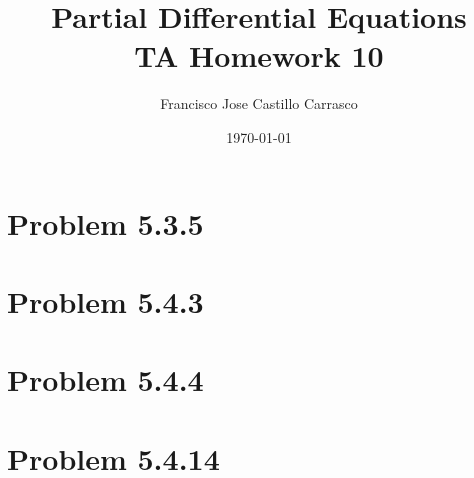 




\title{Partial Differential Equations\\TA Homework 10}
\author{Francisco Jose Castillo Carrasco}
\date{\today}
\maketitle




\section*{Problem 5.3.5}

\section*{Problem 5.4.3}

\section*{Problem 5.4.4}

\section*{Problem 5.4.14}


